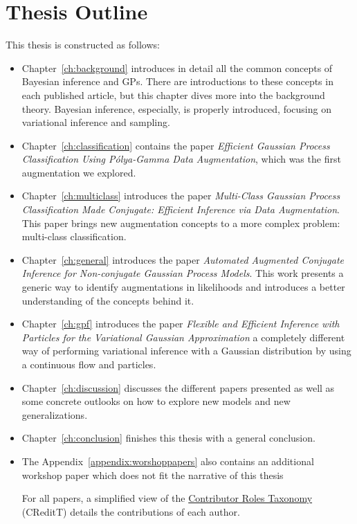 \section{Thesis Outline}

This thesis is constructed as follows:
\begin{itemize}
    \item Chapter~\ref{ch:background} introduces in detail all the common concepts of Bayesian inference and \ac{GPs}.
    There are introductions to these concepts in each published article, but this chapter dives more into the background theory.
    Bayesian inference, especially, is properly introduced, focusing on variational inference and sampling.
    \item Chapter~\ref{ch:classification} contains the paper \textit{Efficient Gaussian Process Classification Using P\'olya-Gamma Data Augmentation}, which was the first augmentation we explored.
    \item Chapter~\ref{ch:multiclass} introduces the paper \textit{Multi-Class Gaussian Process Classification Made Conjugate: Efficient Inference via Data Augmentation}.
    This paper brings new augmentation concepts to a more complex problem: multi-class classification.
    \item Chapter~\ref{ch:general} introduces the paper \textit{Automated Augmented Conjugate Inference for Non-conjugate Gaussian Process Models}.
    This work presents a generic way to identify augmentations in likelihoods and introduces a better understanding of the concepts behind it.
    \item Chapter~\ref{ch:gpf} introduces the paper \textit{Flexible and Efficient Inference with Particles for the Variational Gaussian Approximation } a completely different way of performing variational inference with a Gaussian distribution by using a continuous flow and particles.
    \item Chapter~\ref{ch:discussion} discusses the different papers presented as well as some concrete outlooks on how to explore new models and new generalizations.
    \item Chapter~\ref{ch:conclusion} finishes this thesis with a general conclusion.
    \item The Appendix~\ref{appendix:worshoppapers} also contains an additional workshop paper which does not fit the narrative of this thesis 

    For all papers, a simplified view of the \href{https://mdpi-res.com/data/contributor-role-instruction.pdf}{Contributor Roles Taxonomy} (CReditT) details the contributions of each author.

\end{itemize}

